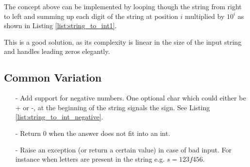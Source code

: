 The concept above can be implemented by looping though the string from right to left and summing up each digit of the string at position $i$  multiplied by $10^i$ as shown in Listing \ref{list:string_to_int1}.




This is a good solution, as its complexity is linear in the size of the input string and handles leading zeros elegantly.

\subsection{Common Variation}
\begin{itemize}
	\item[-] Add support for negative numbers. One optional char which could either be + or -, at the beginning of the string  signals the sign. See Listing \ref{list:string_to_int_negative}.
	\item[-] Return $0$ when the answer does not fit into an int.
	\item[-] Raise an exception (or return a certain value) in case of bad input. For instance when letters are present in the string e.g. $s=123f456$.  
\end{itemize}

